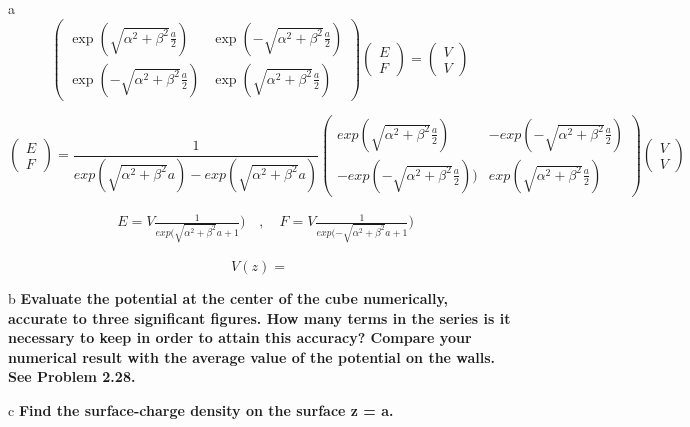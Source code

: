 \begin{homeworkProblem}
\begin{homeworkSection}{a}
\[
\begin{pmatrix} \exp(\sqrt{\alpha^2+\beta^2}\frac{a}{2}) & \exp(-\sqrt{\alpha^2+\beta^2}\frac{a}{2}) 
\\ \exp(-\sqrt{\alpha^2+\beta^2}\frac{a}{2}) & \exp(\sqrt{\alpha^2+\beta^2}\frac{a}{2}) \end{pmatrix}
\left( \begin{array}{c} E \\ F \end{array} \right) = \left( \begin{array}{c} V \\ V \end{array} \right) \nonumber
\]

\[
\left( \begin{array}{c} E \\ F \end{array} \right) = \frac{1}{exp(\sqrt{\alpha^2+\beta^2}a)-exp(\sqrt{\alpha^2+\beta^2}a)} \begin{pmatrix} exp(\sqrt{\alpha^2+\beta^2}\frac{a}{2}) & -exp(-\sqrt{\alpha^2+\beta^2}\frac{a}{2}) \\ -exp(-\sqrt{\alpha^2+\beta^2}\frac{a}{2})) & exp(\sqrt{\alpha^2+\beta^2}\frac{a}{2}) \end{pmatrix} \left( \begin{array}{c} V \\ V \end{array} \right) \nonumber
\]

\begin{align}
&E = V \frac{1}{exp({\sqrt{\alpha^2+\beta^2}a}+1}) \quad,\quad F = V \frac{1}{exp({-\sqrt{\alpha^2+\beta^2}a}+1}) \nonumber
\end{align}

\[
V(z) = 
\]

\end{homeworkSection}

\begin{homeworkSection}{b}
\textbf{Evaluate the potential at the center of the cube numerically, accurate to three 
significant figures. How many terms in the series is it necessary to keep in 
order to attain this accuracy? Compare your numerical result with the average 
value of the potential on the walls. See Problem 2.28.}

\end{homeworkSection}

\begin{homeworkSection}{c}
\textbf{Find the surface-charge density on the surface z = a.}
\end{homeworkSection}

\end{homeworkProblem}